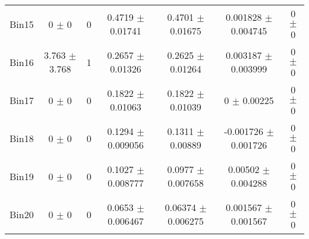 \begin{tabular}{@{\extracolsep{4pt}}lcccccc@{}}
     Bin15 & 0 $\pm$ 0 & 0 & 0.4719 $\pm$ 0.01741 & 0.4701 $\pm$ 0.01675 & 0.001828 $\pm$ 0.004745 & 0 $\pm$ 0 \\ 
     Bin16 & 3.763 $\pm$ 3.768 & 1 & 0.2657 $\pm$ 0.01326 & 0.2625 $\pm$ 0.01264 & 0.003187 $\pm$ 0.003999 & 0 $\pm$ 0 \\ 
     Bin17 & 0 $\pm$ 0 & 0 & 0.1822 $\pm$ 0.01063 & 0.1822 $\pm$ 0.01039 & 0 $\pm$ 0.00225 & 0 $\pm$ 0 \\ 
     Bin18 & 0 $\pm$ 0 & 0 & 0.1294 $\pm$ 0.009056 & 0.1311 $\pm$ 0.00889 & -0.001726 $\pm$ 0.001726 & 0 $\pm$ 0 \\ 
     Bin19 & 0 $\pm$ 0 & 0 & 0.1027 $\pm$ 0.008777 & 0.0977 $\pm$ 0.007658 & 0.00502 $\pm$ 0.004288 & 0 $\pm$ 0 \\ 
     Bin20 & 0 $\pm$ 0 & 0 & 0.0653 $\pm$ 0.006467 & 0.06374 $\pm$ 0.006275 & 0.001567 $\pm$ 0.001567 & 0 $\pm$ 0 \\ 
\hline\hline
  \end{tabular}

